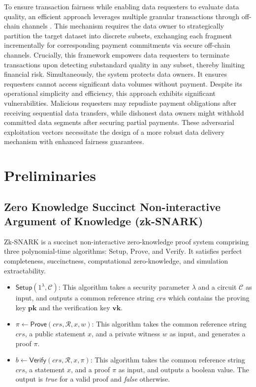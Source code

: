 \documentclass[journal]{IEEEtran}
\begin{document}
To ensure transaction fairness while enabling data requesters to evaluate data quality, an efficient approach leverages multiple granular transactions through off-chain channels \cite{luo2024crosschannel}. This mechanism requires the data owner to strategically partition the target dataset into discrete subsets, exchanging each fragment incrementally for corresponding payment commitments via secure off-chain channels. Crucially, this framework empowers data requesters to terminate transactions upon detecting substandard quality in any subset, thereby limiting financial risk. Simultaneously, the system protects data owners. It ensures requesters cannot access significant data volumes without payment. Despite its operational simplicity and efficiency, this approach exhibits significant vulnerabilities. Malicious requesters may repudiate payment obligations after receiving sequential data transfers, while dishonest data owners might withhold committed data segments after securing partial payments. These adversarial exploitation vectors necessitate the design of a more robust data delivery mechanism with enhanced fairness guarantees.


\section{Preliminaries}\label{section:preleminaries}

\subsection{Zero Knowledge Succinct Non-interactive Argument of Knowledge (zk-SNARK)}\label{subsec:zk-SNARK}

Zk-SNARK \cite{ben2014succinct} is a succinct non-interactive zero-knowledge proof system comprising three polynomial-time algorithms: 
$\text{Setup}$, $\text{Prove}$, and $\text{Verify}$. It satisfies perfect completeness, succinctness, computational zero-knowledge, and simulation extractability.


\begin{itemize}
    \item $\mathsf{Setup}(1^\lambda, \mathcal{C})$: This algorithm takes a security parameter $\lambda$ and a circuit $\mathcal{C}$ as input, and outputs a common reference string $crs$ which contains the proving key $\mathbf{pk}$ and the verification key $\mathbf{vk}$.
    \item $\pi \leftarrow \mathsf{Prove}(crs, \mathcal{R}, x, w)$: This algorithm takes the common reference string $crs$, a public statement $x$, and a private witness $w$ as input, and generates a proof $\pi$. 
    \item $b \leftarrow \mathsf{Verify}(crs, \mathcal{R}, x, \pi)$: This algorithm takes the common reference string $crs$, a statement $x$, and a proof $\pi$ as input, and outputs a boolean value. The output is \textit{true} for a valid proof and \textit{false} otherwise.
\end{itemize}
\end{document}
